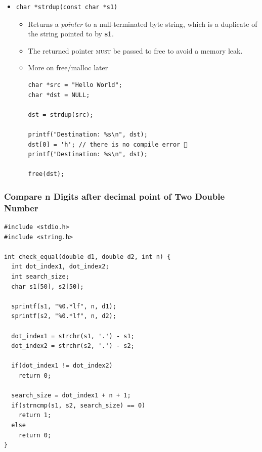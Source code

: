\documentclass{../c-lecture}
\begin{document}
\begin{frame}[fragile]
  \begin{itemize}
    \item
    \begin{verbatim}
char *strdup(const char *s1)
    \end{verbatim}

    \begin{itemize}
      \item
        Returns a \textit{\color{Cyan} pointer} to a null-terminated
        byte string, which is a duplicate of the string pointed to by
        \textbf{\color{YellowOrange} s1}.

      \item
        The returned pointer \textsc{\color{Purple} must} be passed to free to avoid a memory leak.

      \item More on free/malloc later
      \begin{verbatim}
char *src = "Hello World";
char *dst = NULL;

dst = strdup(src);

printf("Destination: %s\n", dst);
dst[0] = 'h'; // there is no compile error 🕺
printf("Destination: %s\n", dst);

free(dst);
      \end{verbatim}
    \end{itemize}
  \end{itemize}
\end{frame}

\begin{frame}[fragile]
  \frametitle{Compare n Digits after decimal point of Two Double Number}
  \tiny
  \begin{verbatim}
#include <stdio.h>
#include <string.h>

int check_equal(double d1, double d2, int n) {
  int dot_index1, dot_index2;
  int search_size;
  char s1[50], s2[50];

  sprintf(s1, "%0.*lf", n, d1);
  sprintf(s2, "%0.*lf", n, d2);

  dot_index1 = strchr(s1, '.') - s1;
  dot_index2 = strchr(s2, '.') - s2;

  if(dot_index1 != dot_index2)
    return 0;

  search_size = dot_index1 + n + 1;
  if(strncmp(s1, s2, search_size) == 0)
    return 1;
  else
    return 0;
}
  \end{verbatim}
\end{frame}
\end{document}
